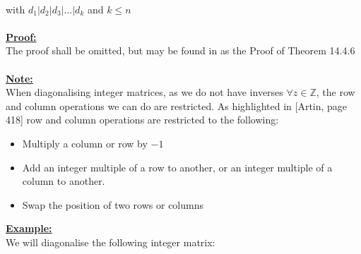 \documentclass[11pt]{article}
\theoremstyle{plain}
\theoremstyle{definition}
\begin{document}
\\
with $d_1 | d_2 | d_3 | \ldots | d_k$ and $k \leq n$\\
\\
\textbf{\underline{Proof:}}\\
The proof shall be omitted, but may be found in \cite{Algebra} as the Proof of Theorem 14.4.6\\
\\
\textbf{\underline{Note:}}\\
When diagonalising integer matrices, as we do not have inverses $\forall z \in \mathbb{Z}$, the row and column operations we can do are restricted.  As highlighted in [Artin, page 418] row and column operations are restricted to the following:
\begin{itemize}
	\item Multiply a column or row by $-1$
	\item Add an integer multiple of a row to another, or an integer multiple of a column to another.
	\item Swap the position of two rows or columns
\end{itemize}
\textbf{\underline{Example:}} \\We will diagonalise the following integer matrix:
\end{document}
